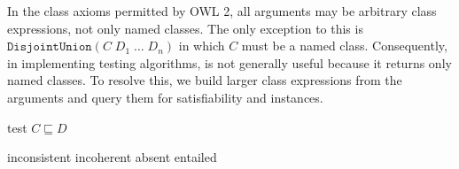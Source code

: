 \documentclass[paper.tex]{subfiles}
\begin{document}

In the class axioms permitted by OWL 2, all arguments may be arbitrary class expressions, not only named classes.  The only exception to this is $\mathtt{DisjointUnion}(C \; D_1 \; \ldots \; D_n)$ in which $C$ must be a named class.  Consequently, in implementing testing algorithms,  is not generally useful because it returns only named classes.  To resolve this, we build larger class expressions from the arguments and query them for satisfiability and instances.

\begin{algorithm}[H]
  \caption{test $C \sqsubseteq D$}
  \begin{algorithmic}[1]
    \raggedright
        \State \Return inconsistent
        \State \Return incoherent
        \State \Return absent
      \Else
        \State \Return entailed
        \label{alg:testSubClassOf:returnEntailed}
      \EndIf
    \EndFunction
  \end{algorithmic}
\end{algorithm}
\end{document}

